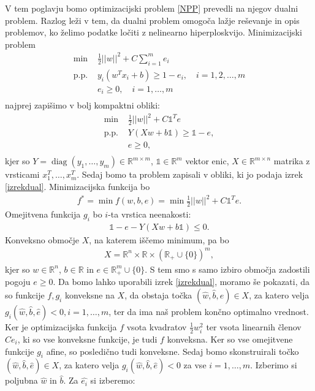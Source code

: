 \documentclass[mat1]{fmfdelo}
\newcommand{\R}{\mathbb R}
\DeclareMathOperator{\diag}{diag}
\begin{document}
V tem poglavju bomo optimizacijski problem \eqref{NPP}  prevedli na njegov dualni problem.  
Razlog leži v tem, da dualni problem omogoča lažje reševanje in opis problemov, ko želimo podatke ločiti z nelinearno hiperploskvijo.  
Minimizacijski problem
\begin{align*}
\min{} &\frac{1}{2}||w||^2 + C\sum_{i = 1}^{m}e_i \\ 
\text{p.p. } &y_i( w^T x_i + b)\ge 1 - e_i,  \quad i= 1, 2, \ldots, m \\
&e_i \ge 0, \quad i = 1, \ldots, m \\
\end{align*}
najprej zapišimo v bolj kompaktni obliki: 
\begin{align*}
\min{} &\frac{1}{2}||w||^2 + C \mathds{1}^Te \\ 
\text{p.p. } &Y( Xw + b \mathds{1})\ge \mathds{1} - e,  \\
&e \ge 0, \\
\end{align*}
kjer so $Y = \diag(y_1, \ldots, y_m)\in \R^{m\times m}$, $\mathds{1} \in \R^m$ vektor enic, $X \in \R^{m\times n}$ matrika z vrsticami $x_1^T, \ldots, x_m^T$. 
Sedaj bomo ta problem zapisali v obliki, ki jo podaja izrek \ref{izrekdual}. Minimizacijska funkcija bo 
\begin{align*}
f^* = \min f(w, b, e) = \min \frac{1}{2}||w||^2 + C \mathds{1}^Te.
\end{align*}
Omejitvena funkcija $g_i$ bo $i$-ta vrstica neenakosti:
\begin{align*}
\mathds{1} - e - Y( Xw + b \mathds{1}) \le 0.
\end{align*}
Konveksno območje $X$, na katerem iščemo minimum, pa bo
\begin{align*}
X = \R^n \times \R \times (\R_+ \cup \{0\})^m,
\end{align*}
kjer so $w\in \R^n$, $b \in \R$ in $e \in  \R^m_+ \cup \{0\}.$ S tem smo s samo izbiro območja zadostili pogoju $e \ge 0$. Da bomo lahko uporabili izrek \ref{izrekdual}, moramo še pokazati, da so funkcije $f, g_i$ konveksne na $X$, da obstaja točka $(\widehat{w}, \widehat{b}, \widehat{e}) \in X$, za katero velja $g_i(\widehat{w}, \widehat{b}, \widehat{e}) < 0, i = 1, \ldots, m$, ter da ima naš problem končno optimalno vrednost.  Ker je optimizacijska funkcija $f$ vsota kvadratov $\frac{1}{2}w_i^2$ ter vsota linearnih členov $Ce_i$, ki so vse konveksne funkcije, je tudi $f$ konveksna.  Ker so vse omejitvene funkcije $g_i$ afine, so  posledično tudi konveksne. Sedaj bomo skonstruirali točko $(\widehat{w}, \widehat{b}, \widehat{e}) \in X$, za katero velja $g_i(\widehat{w}, \widehat{b}, \widehat{e}) < 0$ za vse $i = 1, \ldots, m$. Izberimo si poljubna $\widehat{w}$ in $\widehat{b}$. Za $\widehat{e_i}$ si izberemo: 
\end{document}
